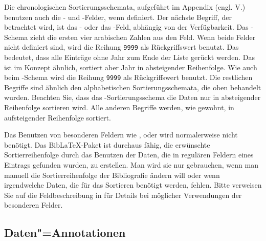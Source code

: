 \documentclass{ltxdockit}[2011/03/25]
\newcommand*{\biblatex}{BibLaTeX\xspace}
\begin{document}
Die chronologischen Sortierungsschemata, aufgeführt im Appendix (engl. V.)
benutzen auch die - und -Felder, wenn
definiert. Der nächste Begriff, der betrachtet wird, ist das
- oder das -Feld, abhängig von der Verfügbarkeit.
Das -Schema zieht die ersten vier arabischen Zahlen aus den Feld. Wenn beide 
Felder nicht definiert sind, wird die Reihung \texttt{9999} als Rückgriffswert
benutzt. Das bedeutet, dass alle Einträge ohne Jahr zum Ende der Liste gerückt
werden. Das  ist im Konzept ähnlich, sortiert aber Jahr in
absteigender Reihenfolge. Wie auch beim -Schema wird die Reihung
\texttt{9999} als Rückgriffswert benutzt. Die restlichen Begriffe sind ähnlich
den alphabetischen Sortierungsschemata, die oben behandelt wurden. Beachten
Sie, dass
das -Sortierungsschema die Daten nur in absteigender Reihenfolge
sortieren wird. Alle anderen Begriffe  werden, wie gewohnt, in aufsteigender
Reihenfolge sortiert.             

Das Benutzen von besonderen Feldern wie ,  oder
 wird normalerweise nicht benötigt. Das \biblatex-Paket
ist durchaus fähig, die erwünschte Sortierreihenfolge durch das Benutzen der Daten,
die in regulären Feldern eines Eintrags gefunden wurden, zu erstellen. Man wird
sie nur gebrauchen, wenn man manuell die Sortierreihenfolge der Bibliografie
ändern will oder wenn irgendwelche Daten, die für das Sortieren benötigt werden,
fehlen. Bitte verweisen Sie auf die Feldbeschreibung in  für
Details bei möglicher Verwendungen der besonderen Felder. 

\subsection{Daten"=Annotationen}\label{use:annote}
\end{document}
